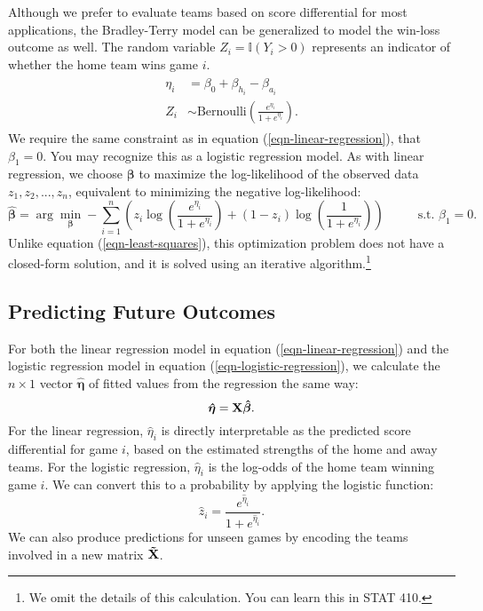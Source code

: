 \documentclass{article}
\begin{document}
  Although we prefer to evaluate teams based on score differential for most applications, the Bradley-Terry model can be generalized to model the win-loss outcome as well. The random variable $Z_i = \mathbb{I}(Y_i > 0)$ represents an indicator of whether the home team wins game $i$.
  \begin{align}
    \label{eqn-logistic-regression}
    \begin{split}
      \eta_i &= \beta_0 + \beta_{h_i} - \beta_{a_i}\\
      Z_i &\sim \mbox{Bernoulli}\left(\frac{e^{\eta_i}}{1 + e^{\eta_i}}\right).
    \end{split}
  \end{align}
  We require the same constraint as in equation (\ref{eqn-linear-regression}), that $\beta_1 = 0$. You may recognize this as a logistic regression model. As with linear regression, we choose $\boldsymbol{\beta}$ to maximize the log-likelihood of the observed data $z_1, z_2, ..., z_n$, equivalent to minimizing the negative log-likelihood:
  \begin{equation*}
    \boldsymbol{\hat\beta} = \arg\min_{\boldsymbol{\beta}} -\sum_{i=1}^n \left(z_i \log\left(\frac{e^{\eta_i}}{1 + e^{\eta_i}}\right) + (1 - z_i) \log\left(\frac{1}{1 + e^{\eta_i}}\right)\right) \hspace{1cm} \mbox{ s.t. } \beta_1 = 0.
  \end{equation*}
  Unlike equation (\ref{eqn-least-squares}), this optimization problem does not have a closed-form solution, and it is solved using an iterative algorithm.\footnote{We omit the details of this calculation. You can learn this in STAT 410.}

  \subsection{\sc Predicting Future Outcomes}

  For both the linear regression model in equation (\ref{eqn-linear-regression}) and the logistic regression model in equation (\ref{eqn-logistic-regression}), we calculate the $n \times 1$ vector $\boldsymbol{\hat\eta}$ of fitted values from the regression the same way:
  \begin{equation*}
    \boldsymbol{\hat\eta} = {\bf X} \boldsymbol{\hat\beta}.
  \end{equation*}
  For the linear regression, $\hat\eta_i$ is directly interpretable as the predicted score differential for game $i$, based on the estimated strengths of the home and away teams. For the logistic regression, $\hat\eta_i$ is the log-odds of the home team winning game $i$. We can convert this to a probability by applying the logistic function:
  \begin{equation*}
    \hat z_i = \frac{e^{\hat\eta_i}}{1 + e^{\hat\eta_i}}.
  \end{equation*}
  We can also produce predictions for unseen games by encoding the teams involved in a new matrix ${\bf \tilde X}$.
\end{document}
